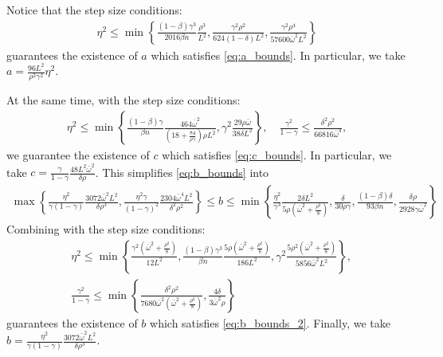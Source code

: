 \documentclass[10pt]{article} %
\theoremstyle{plain}
\theoremstyle{definition}
\theoremstyle{remark}
\newcommand{\bw}{\bar{\omega}}
\newcommand{\nl}{\nonumber\\}
\begin{document}
Notice that the step size conditions:
\begin{align} \label{eq:whole_step_2nd}
\eta^2 \leq \min 
\left\{ \frac{(1-\beta)\gamma^3}{2016\beta n }\frac{\rho^3}{L^2},
        \frac{\gamma^2\rho^2}{624(1-\delta)L^2},
        \frac{\gamma^2\rho^4}{57600\bw^2L^2} 
\right\} \tag{S2}
\end{align}
guarantees the existence of $a$ which satisfies \eqref{eq:a_bounds}. In particular, we take $a = \frac{96L^2}{\rho^2\gamma^2}\eta^2$. 

At the same time, with the step size conditions:
\begin{align} \label{eq:whole_step_3rd}
   \eta^2 \leq \min \left\{ \frac{(1-\beta)\gamma}{\beta n} \frac{464\bw^2}{(18+\frac{84}{\rho\gamma})\rho L^2}, \gamma^2 \frac{29 \rho\bw}{38\delta L^2} \right\}, \quad \frac{\gamma^2}{1-\gamma} \leq \frac{\delta^2\rho^2}{66816\bw^4}, \tag{S3}
\end{align}
we guarantee the existence of $c$ which satisfies \eqref{eq:c_bounds}. In particular, we take $c = \frac{\gamma}{1-\gamma}\frac{48 L^2\bw^2}{\delta\rho}$.
This simplifies \eqref{eq:b_bounds} into
\begin{align}
    \max \left\{ \frac{\eta^2}{\gamma(1-\gamma)}\frac{3072\bw^2 L^2}{\delta\rho^3}, \frac{\eta^2\gamma}{(1-\gamma)^2}\frac{2304\bw^4 L^2}{\delta^2\rho^2} \right\} \leq b \leq \min \left\{ \frac{\eta^2}{\gamma^3} \frac{2\delta L^2}{5\rho (\bw^2 + \frac{\rho^2}{8})}, \frac{\delta}{30 \rho\gamma}, \frac{(1-\beta)\delta}{93\beta n}, \frac{\delta\rho}{2928\gamma\bw^2}\right\}  \label{eq:b_bounds_2} 
\end{align}
Combining with the step size conditions:
\begin{align}
    & \eta^2 \leq \min \left\{ \frac{\gamma^2(\bw^2 + \frac{\rho^2}{8})}{12 L^2}, \frac{(1-\beta)\gamma^3}{\beta n} \frac{5\rho(\bw^2 + \frac{\rho^2}{8})}{186 L^2}, \gamma^2 \frac{5\rho^2(\bw^2+\frac{\rho^2}{8})}{5856 \bw^2 L^2} \right\}, 
    \nl & \frac{\gamma^2}{1-\gamma} \leq \min \left\{ \frac{\delta^2\rho^2}{7680 \bw^2 (\bw^2 + \frac{\rho^2}{8})}, \frac{4\delta}{3\bw^2\rho}\right\} \tag{S4} \label{eq:whole_step_4th}
\end{align}
guarantees the existence of $b$ which satisfies \eqref{eq:b_bounds_2}. Finally, we take $b = \frac{\eta^2}{\gamma(1-\gamma)}\frac{3072\bw^2 L^2}{\delta\rho^3}$. 
\end{document}
